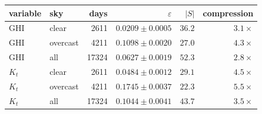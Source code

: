 \begin{tabular}{llrrrr}
\toprule
variable & sky & days & $\varepsilon$ & $|S|$ & compression \\
\midrule
GHI & clear & 2611 & $0.0209 \pm 0.0005$ & $36.2$ & $3.1\times$ \\
GHI & overcast & 4211 & $0.1098 \pm 0.0020$ & $27.0$ & $4.3\times$ \\
GHI & all & 17324 & $0.0627 \pm 0.0019$ & $52.3$ & $2.8\times$ \\
$K_t$ & clear & 2611 & $0.0484 \pm 0.0012$ & $29.1$ & $4.5\times$ \\
$K_t$ & overcast & 4211 & $0.1745 \pm 0.0037$ & $22.3$ & $5.5\times$ \\
$K_t$ & all & 17324 & $0.1044 \pm 0.0041$ & $43.7$ & $3.5\times$ \\
\bottomrule
\end{tabular}
